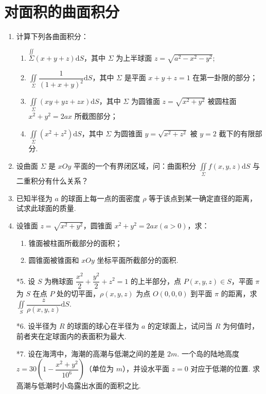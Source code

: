 \section{对面积的曲面积分}

\begin{enumerate}\setlength{\itemsep}{7pt}
    \item 计算下列各曲面积分：
    \begin{enumerate}[(1)]\setlength{\itemsep}{5pt}\setlength{\topsep}{15pt}
        \item $\displaystyle\stackrel{\iint}{\Sigma}(x+y+z)\text{d}S$，其中 $\Sigma$ 为上半球面 $z=\sqrt{a^2-x^2-y^2}$;
        \item $\displaystyle\iint\limits_{\Sigma}\dfrac{1}{(1+x+y)^2}\text{d}S$，其中 $\Sigma$ 是平面 $x+y+z=1$ 在第一卦限的部分；
        \item $\displaystyle\iint\limits_{\Sigma}(xy+yz+zx)\text{d}S$，其中 $\Sigma$ 为圆锥面 $z=\sqrt{x^2+y^2}$ 被圆柱面 $x^2+y^2=2ax$ 所截图部分；
        \item $\displaystyle\iint\limits_{\Sigma}(x^2+z^2)\text{d}S$，其中 $\Sigma$ 为圆锥面 $y=\sqrt{x^2+z^2}$ 被 $y=2$ 截下的有限部分.
    \end{enumerate}

    \item 设曲面 $\Sigma$ 是 $xOy$ 平面的一个有界闭区域，问：曲面积分 $\displaystyle\iint\limits_{\Sigma}f(x, y, z)\text{d}S$ 与二重积分有什么关系？
    
    \item 已知半径为 $a$ 的球面上每一点的面密度 $\rho$ 等于该点到某一确定直径的距离，试求此球面的质量.
    
    \item 设锥面 $z=\sqrt{x^2+y^2}$，圆锥面 $x^2+y^2=2ax(a>0)$，求：
    \begin{enumerate}[(1)]\setlength{\itemsep}{5pt}\setlength{\topsep}{15pt}
        \item 锥面被柱面所截部分的面积；
        \item 圆锥面被锥面和 $xOy$ 坐标平面所截部分的面积.
    \end{enumerate}

    \item[*5.] 设 $S$ 为椭球面 $\dfrac{x^2}{2}+\dfrac{y^2}{2}+z^2=1$ 的上半部分，点 $P(x, y, z)\in S$，平面 $\pi$ 为 $S$ 在点 $P$ 处的切平面，$\rho(x, y, z)$ 为点 $O(0, 0, 0)$ 到平面 $\pi$ 的距离，求 $\displaystyle\iint\limits_{S}\dfrac{z}{\rho(x, y, z)}\text{d}S$.
    
    \item[*6.] 设半径为 $R$ 的球面的球心在半径为 $a$ 的定球面上，试问当 $R$ 为何值时，前者夹在定球面内的表面积为最大.
    
    \item[*7.] 设在海湾中，海潮的高潮与低潮之间的差是 $2m$. 一个岛的陆地高度 $z=30\left(1-\dfrac{x^2+y^2}{10^6}\right)$（单位为 $m$），并设水平面 $z=0$ 对应于低潮的位置. 求高潮与低潮时小岛露出水面的面积之比. 
\end{enumerate}

